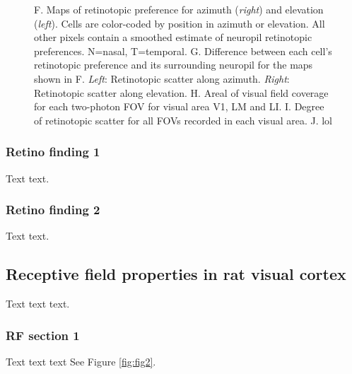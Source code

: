 \documentclass{article}
\begin{document}
\begin{figure}[ht]
  F.  Maps of retinotopic preference for azimuth (\textit{right}) and elevation (\textit{left}).  Cells are color-coded by position in azimuth or elevation.  All other pixels contain a smoothed estimate of neuropil retinotopic preferences. N=nasal, T=temporal.
  G.  Difference between each cell’s retinotopic preference and its surrounding neuropil for the maps shown in F. \textit{Left}:  Retinotopic scatter along azimuth. \textit{Right}:  Retinotopic scatter along elevation.
  H.  Areal of visual field coverage for each two-photon FOV for visual area V1, LM and LI. 
  I.  Degree of retinotopic scatter for all FOVs recorded in each visual area.
  J.  lol
  \label{fig:fig1}
\end{figure}

\subsubsection{Retino finding 1}
Text text. 

\subsubsection{Retino finding 2}
Text text. 



\subsection{Receptive field properties in rat visual cortex}
Text text text.


\subsubsection{RF section 1}
Text text text
See Figure \ref{fig:fig2}.
\end{document}
